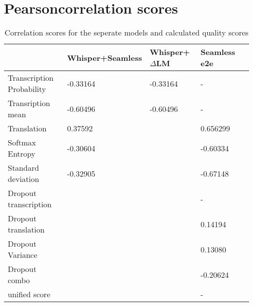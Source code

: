 \section{Pearsoncorrelation scores}
\begin{table}[ht]
\begin{tabular}{l|llll}
 &  Whisper+Seamless & Whisper+$\Delta$LM&  Seamless e2e\\ \hline
 Transcription Probability& -0.33164 & -0.33164&  -  \\
 Transription mean & -0.60496 & -0.60496  &   - \\ \hline
Translation& 0.37592 &    & 0.656299\\ 
Softmax Entropy& -0.30604   &  & -0.60334 \\
Standard deviation & -0.32905  &  & -0.67148 \\ \hline


Dropout transcription &  &  & -\\
Dropout translation & & & 0.14194\\

Dropout Variance & & & 0.13080\\
Dropout combo & & & -0.20624\\
\hline
unified score   &  &  & - %



\end{tabular}
\label{results}
\caption{Correlation scores for the seperate models and calculated quality scores}
\end{table}
